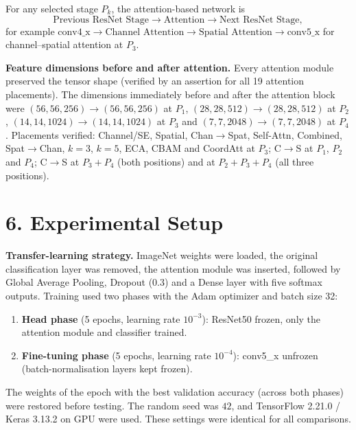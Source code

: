 \documentclass[10pt]{article}
\begin{document}
For any selected stage $P_k$, the attention-based network is
\[
\text{Previous ResNet Stage}
\rightarrow
\text{Attention}
\rightarrow
\text{Next ResNet Stage},
\]
for example
$\text{conv4\_x}\rightarrow\text{Channel Attention}\rightarrow\text{Spatial Attention}\rightarrow\text{conv5\_x}$
for channel--spatial attention at $P_3$.

\textbf{Feature dimensions before and after attention.} Every attention
module preserved the tensor shape (verified by an assertion for all 19
attention placements). The dimensions immediately before and after the
attention block were $(56,56,256)\rightarrow(56,56,256)$ at $P_1$,
$(28,28,512)\rightarrow(28,28,512)$ at $P_2$,
$(14,14,1024)\rightarrow(14,14,1024)$ at $P_3$ and
$(7,7,2048)\rightarrow(7,7,2048)$ at $P_4$. Placements verified: Channel/SE,
Spatial, Chan$\rightarrow$Spat, Self-Attn, Combined, Spat$\rightarrow$Chan,
$k=3$, $k=5$, ECA, CBAM and CoordAtt at $P_3$; C$\rightarrow$S at $P_1$,
$P_2$ and $P_4$; C$\rightarrow$S at $P_3{+}P_4$ (both positions) and at
$P_2{+}P_3{+}P_4$ (all three positions).

\section*{6. Experimental Setup}

\textbf{Transfer-learning strategy.} ImageNet weights were loaded, the
original classification layer was removed, the attention module was
inserted, followed by Global Average Pooling, Dropout ($0.3$) and a Dense
layer with five softmax outputs. Training used two phases with the Adam
optimizer and batch size 32:

\begin{enumerate}
\item \textbf{Head phase} (5 epochs, learning rate $10^{-3}$): ResNet50 frozen, only the attention module and classifier trained.
\item \textbf{Fine-tuning phase} (5 epochs, learning rate $10^{-4}$): conv5\_x unfrozen (batch-normalisation layers kept frozen).
\end{enumerate}

The weights of the epoch with the best validation accuracy (across both
phases) were restored before testing. The random seed was $42$, and TensorFlow
2.21.0 / Keras 3.13.2 on GPU were used. These settings were identical for all
comparisons.
\end{document}
